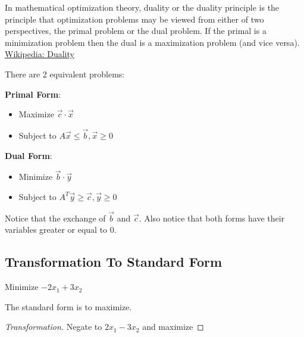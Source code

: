 \begin{definition}[Duality]
    In mathematical optimization theory, duality or the duality principle is the principle that optimization problems may be viewed from either of two perspectives, the primal problem or the dual problem. If the primal is a minimization problem then the dual is a maximization problem (and vice versa). \href{https://en.wikipedia.org/wiki/Duality_(optimization)}{Wikipedia: Duality}
\end{definition}

\begin{definition}
    There are 2 equivalent problems:

    \textbf{Primal Form}:
    \begin{itemize}
        \item Maximize \(\vec{c}  \cdot \vec{x}\) 
        \item Subject to \(A \vec{x} \leq \vec{b} , \vec{x}  \geq 0\) 
    \end{itemize}

    \textbf{Dual Form}:
    \begin{itemize}
        \item Minimize \(\vec{b}  \cdot \vec{y} \)  
        \item Subject to \(A^T \vec{y} \geq \vec{c} , \vec{y} \geq 0\) 
    \end{itemize} 

    \begin{remark}
        Notice that the exchange of \(\vec{b}\) and \(\vec{c}\). 
        Also notice that both forms have their variables greater or equal to 0.
    \end{remark}

\end{definition}

\subsection{Transformation To Standard Form}

\begin{example}
    Minimize \(-2x_1 + 3x_2\) 
    \begin{remark}
        The standard form is to maximize.
    \end{remark}
\end{example}
\begin{proof}[Transformation]
   Negate to \(2x_1 - 3x_2\) and maximize  
\end{proof}

